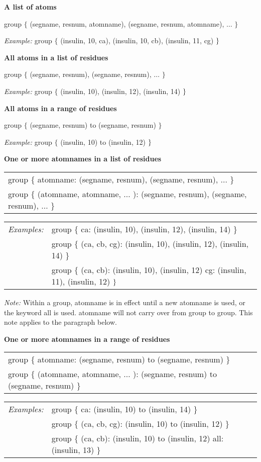 {\bf A list of atoms}

group $\{$ (segname, resnum, atomname), (segname, resnum, atomname), $\ldots 
$ $\}$

{\em Example:} group $\{$ (insulin, 10, ca), (insulin, 10, cb), (insulin,
11, cg) $\}\medskip $

{\bf All atoms in a list of residues}

group $\{$ (segname, resnum), (segname, resnum), $\ldots $ $\}$

{\em Example:} group $\{$ (insulin, 10), (insulin, 12), (insulin, 14) $
\}\medskip $

{\bf All atoms in a range of residues}

group $\{$ (segname, resnum) to (segname, resnum) $\}$

{\em Example:} group $\{$ (insulin, 10) to (insulin, 12) $\}\medskip $

{\bf One or more atomnames in a list of residues}

\begin{tabular}{l}
group $\{$ atomname: (segname, resnum), (segname, resnum), $\ldots $ $\}$ \\ 
group $\{$ (atomname, atomname, $\ldots $ ): (segname, resnum), (segname,
resnum), $\ldots $ $\}$
\end{tabular}

\begin{tabular}{ll}
{\em Examples:} & group $\{$ ca: (insulin, 10), (insulin, 12), (insulin, 14) 
$\}$ \\ 
& group $\{$ (ca, cb, cg): (insulin, 10), (insulin, 12), (insulin, 14) $\}$
\\ 
& group $\{$ (ca, cb): (insulin, 10), (insulin, 12) cg: (insulin, 11),
(insulin, 12) $\}\smallskip $
\end{tabular}
\medskip 

{\em Note: }Within a group, atomname is in effect until a new atomname is
used, or the keyword all is used. atomname will not carry over from group to
group. This note applies to the paragraph below.\medskip 

{\bf One or more atomnames in a range of residues}

\begin{tabular}{l}
group $\{$ atomname: (segname, resnum) to (segname, resnum) $\}$ \\ 
group $\{$ (atomname, atomname, $\ldots $ ): (segname, resnum) to (segname,
resnum) $\}$
\end{tabular}

\begin{tabular}{ll}
{\em Examples:} & group $\{$ ca: (insulin, 10) to (insulin, 14) $\}$ \\ 
& group $\{$ (ca, cb, cg): (insulin, 10) to (insulin, 12) $\}$ \\ 
& group $\{$ (ca, cb): (insulin, 10) to (insulin, 12) all: (insulin, 13) $\}$
\end{tabular}

